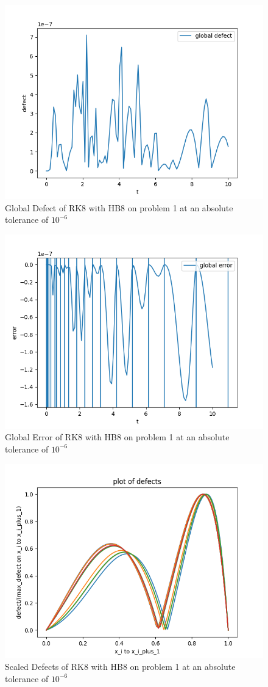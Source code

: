 \documentclass{article}
\begin{document}
\begin{figure}[H]
\centering
\includegraphics[width=0.7\linewidth]{./figures/rk8_with_hb8_p1_global_defect}
\caption{Global Defect of RK8 with HB8 on problem 1 at an absolute tolerance of $10^{-6}$}
\label{fig:rk8_with_hb8_p1_global_defect}
\end{figure}

\begin{figure}[H]
\centering
\includegraphics[width=0.7\linewidth]{./figures/rk8_with_hb8_p1_global_error}
\caption{Global Error of RK8 with HB8 on problem 1 at an absolute tolerance of $10^{-6}$}
\label{fig:rk8_with_hb8_p1_global_error}
\end{figure}

\begin{figure}[H]
\centering
\includegraphics[width=0.7\linewidth]{./figures/rk8_with_hb8_p1_scaled_defects}
\caption{Scaled Defects of RK8 with HB8 on problem 1 at an absolute tolerance of $10^{-6}$}
\label{fig:rk8_with_hb8_p1_scaled_defects}
\end{figure}
\end{document}
